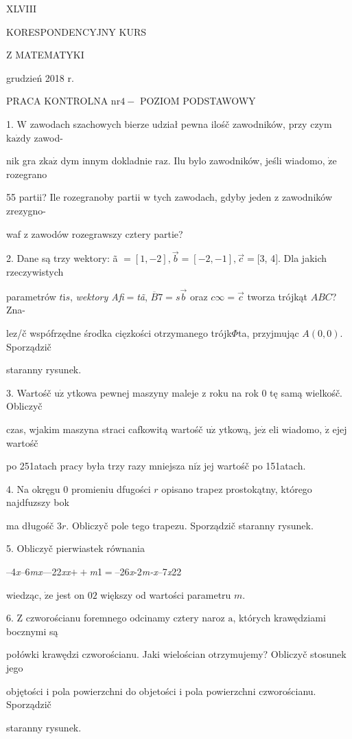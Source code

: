 \documentclass[a4paper,12pt]{article}
\begin{document}
XLVIII

KORESPONDENCYJNY KURS

Z MATEMATYKI

grudzień 2018 r.

PRACA KONTROLNA $\mathrm{n}\mathrm{r} 4-$ POZIOM PODSTAWOWY

1. $\mathrm{W}$ zawodach szachowych bierze udział pewna ilośč zawodników, przy czym $\mathrm{k}\mathrm{a}\dot{\mathrm{z}}\mathrm{d}\mathrm{y}$ zawod-

nik gra $\mathrm{z}\mathrm{k}\mathrm{a}\dot{\mathrm{z}}$ dym innym dokladnie $\mathrm{r}\mathrm{a}\mathrm{z}$. Ilu bylo zawodników, jeśli wiadomo, $\dot{\mathrm{z}}\mathrm{e}$ rozegrano

55 partii? Ile rozegranoby partii $\mathrm{w}$ tych zawodach, gdyby jeden $\mathrm{z}$ zawodników zrezygno-

waf $\mathrm{z}$ zawodów rozegrawszy cztery partie?

2. Dane są trzy wektory: ã $= [1,-2], \vec{b}= [-2,-1], \vec{c}= [3$, 4$]$. Dla jakich rzeczywistych

parametrów $t\mathrm{i}s$, {\it wektory Afi}$=${\it tã}, $\overline{B}7=s\vec{b}$ oraz $c\infty=\vec{c}$ tworza trójkąt $ABC$? Zna-

lez/č wspófrzędne środka cięzkości otrzymanego trójk$\Phi$ta, przyjmując $A(0,0)$. Sporządzič

staranny rysunek.

3. Wartośč $\mathrm{u}\dot{\mathrm{z}}$ ytkowa pewnej maszyny maleje $\mathrm{z}$ roku na rok $0$ tę samą wielkośč. Obliczyč

czas, wjakim maszyna straci cafkowitą wartośč $\mathrm{u}\dot{\mathrm{z}}$ ytkową, $\mathrm{j}\mathrm{e}\dot{\mathrm{z}}$ eli wiadomo, $\dot{\mathrm{z}}$ ejej wartośč

po 251atach pracy była trzy razy mniejsza $\mathrm{n}\mathrm{i}\dot{\mathrm{z}}$ jej wartośč po 151atach.

4. Na okręgu $0$ promieniu dfugości $r$ opisano trapez prostokątny, którego najdfuzszy bok

ma długośč $3r$. Obliczyč pole tego trapezu. Sporządzič staranny rysunek.

5. Obliczyč pierwiastek równania

--4{\it x}--6{\it mx}---22{\it xx}$++${\it m}1$=$--26{\it x}-2{\it m-x}--7{\it x}22

wiedząc, $\dot{\mathrm{z}}\mathrm{e}$ jest on $02$ większy od wartości parametru $m.$

6. $\mathrm{Z}$ czworościanu foremnego odcinamy cztery naroz $\mathrm{a}$, których krawędziami bocznymi są

połówki krawędzi czworościanu. Jaki wielościan otrzymujemy? Obliczyč stosunek jego

objętości $\mathrm{i}$ pola powierzchni do objetości $\mathrm{i}$ pola powierzchni czworościanu. Sporządzič

staranny rysunek.
\end{document}
